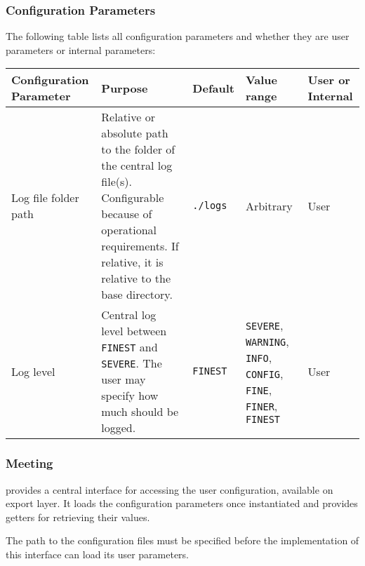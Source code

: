 
\subsubsection{Configuration Parameters}
\label{sec:ConfigurationParameters}

The following table lists all \LibName{} configuration parameters and whether they are user parameters or internal parameters:


\begin{longtable}{|p{}|p{}|p{}|p{}|p{}|}
	\hline
	Configuration Parameter & Purpose & Default & Value range & User or Internal\\
	\endhead
	\hline
	Log file folder path & Relative or absolute path to the folder of the central \LibName{} log file(s). Configurable because of operational requirements. If relative, it is relative to the \LibName{} base directory. & \texttt{./logs} & Arbitrary & User\\
	\hline
	Log level & Central \LibName{} log level between \texttt{FINEST} and \texttt{SEVERE}. The user may specify how much should be logged.& \texttt{FINEST} & \texttt{SEVERE}, \texttt{WARNING}, \texttt{INFO}, \texttt{CONFIG}, \texttt{FINE}, \texttt{FINER}, \texttt{FINEST} & User\\
	\hline
\end{longtable}


\subsubsection{Meeting \REQUconfigUserConfig{}}
\label{sec:REQUconfigUserConfig}

\COMPconfiguration{} provides a central interface for accessing the user configuration, available on export layer. It loads the configuration parameters once instantiated and provides getters for retrieving their values.

The path to the configuration files must be specified before the implementation of this interface can load its user parameters.


